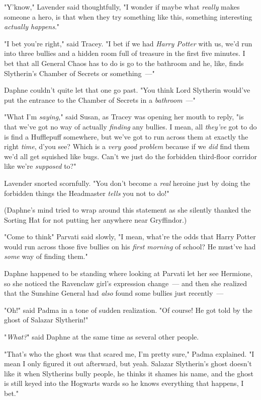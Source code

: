 "Y'know," Lavender said thoughtfully, "I wonder if maybe what \emph{really}
makes someone a hero, is that when they try something like this, something
interesting \emph{actually happens}."

"I bet you're right," said Tracey. "I bet if we had \emph{Harry Potter} with
us, we'd run into three bullies and a hidden room full of treasure in the first
five minutes. I bet that all General Chaos has to do is go to the bathroom and
he, like, finds Slytherin's Chamber of Secrets or something~---"

Daphne couldn't quite let that one go past. "You think Lord Slytherin would've
put the entrance to the Chamber of Secrets in a \emph{bathroom}~---"

"What I'm \emph{saying,}" said Susan, as Tracey was opening her mouth to reply,
"is that we've got no way of actually \emph{finding} any bullies. I mean, all
\emph{they've} got to do is find a Hufflepuff somewhere, but we've got to run
across them at exactly the right \emph{time}, d'you see? Which is a \emph{very
good problem} because if we \emph{did} find them we'd all get squished like
bugs. Can't we just do the forbidden third-floor corridor like we're
\emph{supposed} to?"

Lavender snorted scornfully. "You don't become a \emph{real} heroine just by
doing the forbidden things the Headmaster \emph{tells} you not to do!"

(Daphne's mind tried to wrap around this statement as she silently thanked the
Sorting Hat for not putting her anywhere near Gryffindor.)

"Come to think{\el}" Parvati said slowly, "I mean, what're the odds that
Harry Potter would run across those five bullies on his \emph{first morning} of
school? He must've had \emph{some} way of finding them."

Daphne happened to be standing where looking at Parvati let her see Hermione,
so she noticed the Ravenclaw girl's expression change~--- and then she realized
that the Sunshine General had \emph{also} found some bullies just recently~---

"Oh!" said Padma in a tone of sudden realization. "Of course! He got told by
the ghost of Salazar Slytherin!"

"\emph{What?}" said Daphne at the same time as several other people.

"That's who the ghost was that scared me, I'm pretty sure," Padma explained. "I
mean I only figured it out afterward, but{\el} yeah. Salazar Slytherin's
ghost doesn't like it when Slytherins bully people, he thinks it shames his
name, and the ghost is still keyed into the Hogwarts wards so he knows
everything that happens, I bet."

